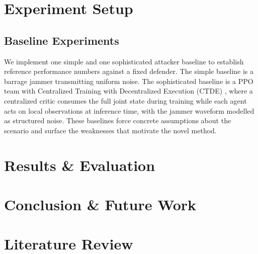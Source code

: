 \documentclass[journal]{IEEEtran}
\begin{document}
\section{Experiment Setup}
\subsection{Baseline Experiments}
We implement one simple and one sophisticated attacker baseline to establish reference performance numbers against a fixed defender. 
The simple baseline is a barrage jammer transmitting uniform noise. 
The sophisticated baseline is a PPO team with Centralized Training with Decentralized Execution (CTDE) \cite{NIPS2017_68a97503}, where a centralized critic consumes the full joint state during training while each agent acts on local observations at inference time, with the jammer waveform modelled as structured noise. These baselines force concrete assumptions about the scenario and surface the weaknesses that motivate the novel method.

\section{Results \& Evaluation}
\section{Conclusion \& Future Work}

\section{Literature Review}
\end{document}

